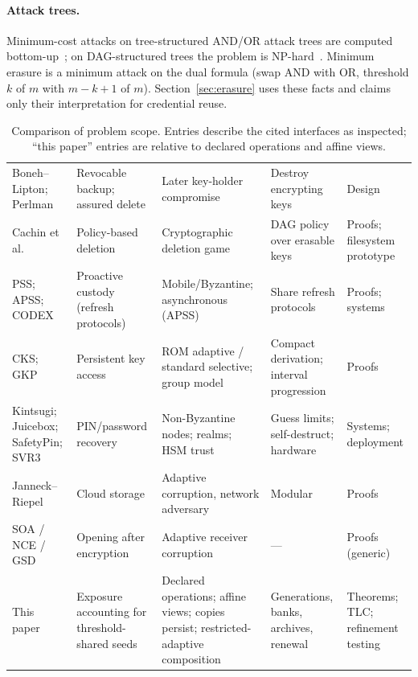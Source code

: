 \documentclass[pdflatex,sn-mathphys-num]{sn-jnl}
\theoremstyle{plain}
\theoremstyle{definition}
\begin{document}
\paragraph{Attack trees.}
Minimum-cost attacks on tree-structured AND/OR attack trees are computed bottom-up~\cite{mauw2005}; on DAG-structured trees the problem is NP-hard~\cite{lopuhaa2022}. Minimum erasure is a minimum attack on the dual formula (swap AND with OR, threshold $k$ of $m$ with $m-k+1$ of $m$). Section~\ref{sec:erasure} uses these facts and claims only their interpretation for credential reuse.

\begin{table}[htbp]
\caption{Comparison of problem scope. Entries describe the cited interfaces as inspected; ``this paper'' entries are relative to declared operations and affine views.}\label{tab:comparison}
\centering\footnotesize
\altrows
\begin{tabularx}{\linewidth}{@{}p{.15\linewidth}YYYY@{}}\toprule
{} &  &  &  & \\\midrule
Boneh--Lipton; Perlman & Revocable backup; assured delete & Later key-holder compromise & Destroy encrypting keys & Design\\
Cachin et al. & Policy-based deletion & Cryptographic deletion game & DAG policy over erasable keys & Proofs; filesystem prototype\\
PSS; APSS; CODEX & Proactive custody (refresh protocols) & Mobile/Byzantine; asynchronous (APSS) & Share refresh protocols & Proofs; systems\\
CKS; GKP & Persistent key access & ROM adaptive / standard selective; group model & Compact derivation; interval progression & Proofs\\
Kintsugi; Juicebox; SafetyPin; SVR3 & PIN/password recovery & Non-Byzantine nodes; realms; HSM trust & Guess limits; self-destruct; hardware & Systems; deployment\\
Janneck--Riepel & Cloud storage & Adaptive corruption, network adversary & Modular & Proofs\\
SOA / NCE / GSD & Opening after encryption & Adaptive receiver corruption & --- & Proofs (generic)\\
This paper & Exposure accounting for threshold-shared seeds & Declared operations; affine views; copies persist; restricted-adaptive composition & Generations, banks, archives, renewal & Theorems; TLC; refinement testing\\\bottomrule
\end{tabularx}
\end{table}
\end{document}
